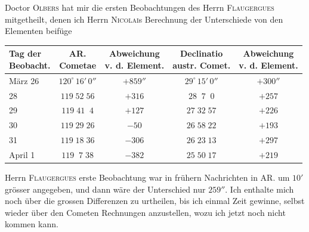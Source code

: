 \par\indent Doctor \textsc{Olbers} hat mir die ersten Beobachtungen des Herrn \textsc{Flaugergues} mitgetheilt, denen ich Herrn \textsc{Nicolai}s Berechnung der Unterschiede von den Elementen beifüge

\begin{center}\fontsize{9}{11}\selectfont\setlength{\tabcolsep}{3pt}\renewcommand{\arraystretch}{1.15}\begin{tabular}{l|c|c|c|c}
\shortstack{Tag der\\Beobacht.} & \shortstack{AR.\\Cometae} & \shortstack{Abweichung\\v. d. Element.} & \shortstack{Declinatio\\austr. Comet.} & \shortstack{Abweichung\\v. d. Element.}\\\hline
März 26 & $120^\circ\,16'\,0''$ & $+859''$ & $29^\circ\,15'\,0''$ & $+300''$\\
28 & $119\;52\;56$ & $+316$ & $28\;\;7\;\;0$ & $+257$\\
29 & $119\;41\;\;4$ & $+127$ & $27\;32\;57$ & $+226$\\
30 & $119\;29\;26$ & $-50$ & $26\;58\;22$ & $+193$\\
31 & $119\;18\;36$ & $-306$ & $26\;23\;13$ & $+297$\\
April 1 & $119\;\;7\;38$ & $-382$ & $25\;50\;17$ & $+219$\\
\end{tabular}\end{center}

\par\indent Herrn \textsc{Flaugergues} erste Beobachtung war in frühern Nachrichten in AR. um $10'$ grösser angegeben, und dann wäre der Unterschied nur $259''$. Ich enthalte mich noch über die grossen Differenzen zu urtheilen, bis ich einmal Zeit gewinne, selbst wieder über den Cometen Rechnungen anzustellen, wozu ich jetzt noch nicht kommen kann.


